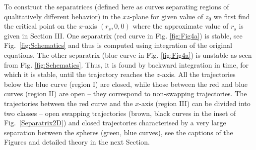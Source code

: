 To construct the separatrices (defined here as curves separating regions of qualitatively different behavior) in the $xz$-plane for given value of $z_0$ we first
find the critical point on the $x$-axis $(r_s,0,0)$ where the approximate value of $r_s$ is given in Section III.
One separatrix (red curve in Fig. \ref{fig:Fig4a}) is stable, see Fig.~\ref{fig:Schematics} and thus is computed
using integration of the original equations. The other separatrix (blue curve in Fig. \ref{fig:Fig4a}) is unstable as seen from Fig. \ref{fig:Schematics}. Thus, it is
found by
backward integration in time, for which it is stable, until the trajectory reaches the $z$-axis. All the trajectories below the blue curve (region I) are closed, while
those between the red and blue curves (region II) are open -- they correspond to
non-swapping trajectories. The trajectories between the red curve and the $x$-axis (region III)
can be divided into two classes -- open swapping trajectories (brown, black curves in the inset of Fig.~\ref{Separatrix2D}) and closed trajectories characterised by a
very large separation between the spheres (green, blue curves), see the captions of the Figures and detailed theory in the next Section.



